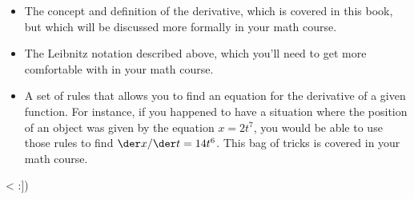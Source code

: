 \begin{itemize}

\item  The concept and definition of the derivative,
which is covered in this book, but which will be discussed
more formally in your math course.

\item  The Leibnitz
notation described above, which you'll need to get more
comfortable with in your math course.

\item  A set of rules that allows you to find an equation for
the derivative of a given function. For instance, if you
happened to have a situation where the position of an object
was given by the equation $x=2t^7$, you would be able to use
those rules to find $\der x/\der t=14t^6$. This bag of
tricks is covered in your math course.

\end{itemize}

<%
:])
